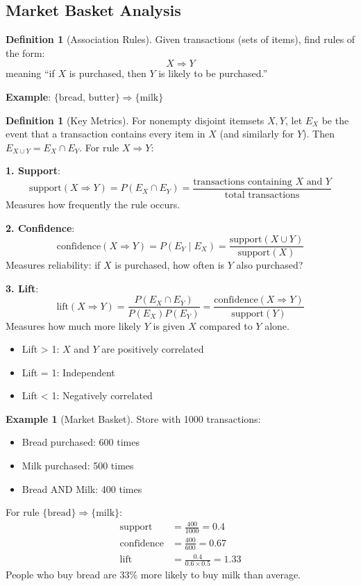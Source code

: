 \documentclass[11pt,twoside]{article}
\numberwithin{equation}{section}
\theoremstyle{plain}
\theoremstyle{definition}
\newtheorem{definition}[theorem]{Definition}
\newtheorem{example}[theorem]{Example}
\theoremstyle{remark}
\begin{document}
\subsection{Market Basket Analysis}

\begin{definition}[Association Rules]
Given transactions (sets of items), find rules of the form:
\[
X \Rightarrow Y
\]
meaning ``if $X$ is purchased, then $Y$ is likely to be purchased.''

\textbf{Example}: $\{\text{bread, butter}\} \Rightarrow \{\text{milk}\}$
\end{definition}

\begin{definition}[Key Metrics]
For nonempty disjoint itemsets $X,Y$, let $E_X$ be the event that a transaction contains every item in $X$ (and similarly for $Y$). Then $E_{X\cup Y}=E_X\cap E_Y$. For rule $X\Rightarrow Y$:

\textbf{1. Support}:
\[
\text{support}(X \Rightarrow Y) = P(E_X\cap E_Y) = \frac{\text{transactions containing } X \text{ and } Y}{\text{total transactions}}
\]
Measures how frequently the rule occurs.

\textbf{2. Confidence}:
\[
\text{confidence}(X \Rightarrow Y) = P(E_Y\mid E_X) = \frac{\text{support}(X \cup Y)}{\text{support}(X)}
\]
Measures reliability: if $X$ is purchased, how often is $Y$ also purchased?

\textbf{3. Lift}:
\[
\text{lift}(X \Rightarrow Y) = \frac{P(E_X\cap E_Y)}{P(E_X)P(E_Y)} = \frac{\text{confidence}(X \Rightarrow Y)}{\text{support}(Y)}
\]
Measures how much more likely $Y$ is given $X$ compared to $Y$ alone.
\begin{itemize}
\item Lift > 1: $X$ and $Y$ are positively correlated
\item Lift = 1: Independent
\item Lift < 1: Negatively correlated
\end{itemize}
\end{definition}

\begin{example}[Market Basket]
Store with 1000 transactions:
\begin{itemize}
\item Bread purchased: 600 times
\item Milk purchased: 500 times
\item Bread AND Milk: 400 times
\end{itemize}

For rule $\{\text{bread}\} \Rightarrow \{\text{milk}\}$:
\begin{align}
\text{support} &= \frac{400}{1000} = 0.4 \\
\text{confidence} &= \frac{400}{600} = 0.67 \\
\text{lift} &= \frac{0.4}{0.6 \times 0.5} = 1.33
\end{align}
People who buy bread are 33\% more likely to buy milk than average.
\end{example}
\end{document}
